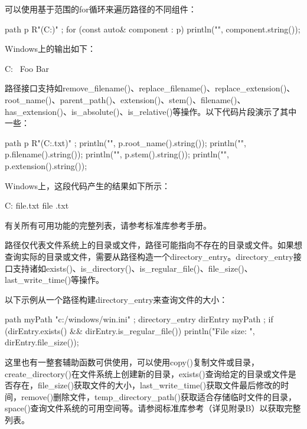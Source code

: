 可以使用基于范围的for循环来遍历路径的不同组件：

\begin{cpp}
path p { R"(C:\Foo\Bar)" };
for (const auto& component : p) {
    println("{}", component.string());
}
\end{cpp}

Windows上的输出如下：

\begin{cpp}
C:
\
Foo
Bar
\end{cpp}

路径接口支持如remove\_filename()、replace\_filename()、replace\_extension()、root\_name()、parent\_path()、extension()、stem()、filename()、has\_extension()、is\_absolute()、is\_relative()等操作。以下代码片段演示了其中一些：

\begin{cpp}
path p { R"(C:\Foo\Bar\file.txt)" };
println("{}", p.root_name().string());
println("{}", p.filename().string());
println("{}", p.stem().string());
println("{}", p.extension().string());
\end{cpp}

Windows上，这段代码产生的结果如下所示：

\begin{shell}
C:
file.txt
file
.txt
\end{shell}

有关所有可用功能的完整列表，请参考标准库参考手册。

\mySubsubsection{13.6.2.}{目录}

路径仅代表文件系统上的目录或文件，路径可能指向不存在的目录或文件。如果想查询实际的目录或文件，需要从路径构造一个directory\_entry。directory\_entry接口支持诸如exists()、is\_directory()、is\_regular\_file()、file\_size()、last\_write\_time()等操作。

以下示例从一个路径构建directory\_entry来查询文件的大小：

\begin{cpp}
path myPath { "c:/windows/win.ini" };
directory_entry dirEntry { myPath };
if (dirEntry.exists() && dirEntry.is_regular_file()) {
    println("File size: {}", dirEntry.file_size());
}
\end{cpp}


这里也有一整套辅助函数可供使用，可以使用copy()复制文件或目录，create\_directory()在文件系统上创建新的目录，exists()查询给定的目录或文件是否存在，file\_size()获取文件的大小，last\_write\_time()获取文件最后修改的时间，remove()删除文件，temp\_directory\_path()获取适合存储临时文件的目录，space()查询文件系统的可用空间等。请参阅标准库参考（详见附录B）以获取完整列表。

